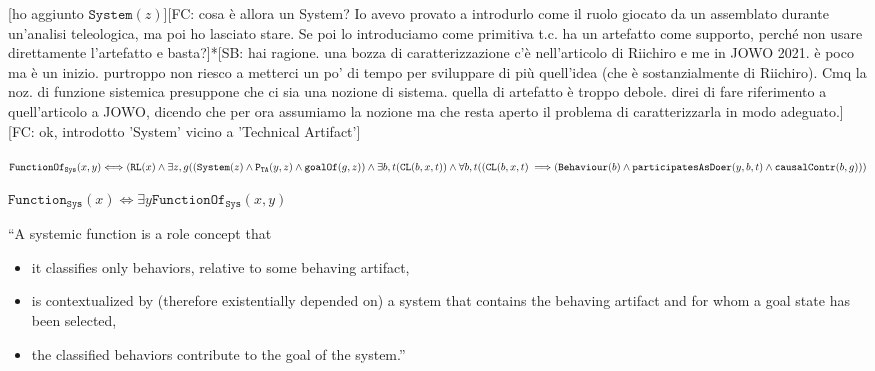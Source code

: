 \documentclass[sw]{iosart2x}
\newcommand{\bflist}{\begin{list}{}{\setlength{\topsep}{2mm}\setlength{\partopsep}{0mm}\setlength{\parsep}{0mm}\setlength{\leftmargin}{9mm}\setlength{\labelwidth}{8mm}}}
\newcommand{\eflist}{\end{list}}
\newcommand{\DefLabel}{\textrm{d}}
\newcounter{cntdef}
\newcommand{\mydf}[1]{\refstepcounter{cntdef}\begin{small}{\bf \DefLabel\thecntdef\label{def:#1}}\end{small}}
\newcommand{\generalStyle}[1]{\texttt{#1}}
\newcommand{\biRel}[3]{\generalStyle{#1}(#2,#3)}
\newcommand{\uniRel}[2]{\generalStyle{#1}(#2)}
\newcommand{\uniRelPar}[3]{\generalStyle{#1}_{\generalStyle{#3}}(#2)}
\newcommand{\biRelPar}[4]{\generalStyle{#1}_{\generalStyle{#4}}(#2,#3)}
\newcommand{\triRelPar}[5]{\generalStyle{#1}_{\generalStyle{#5}}(#2,#3,#4)}
\newcommand{\triRel}[4]{\generalStyle{#1}(#2,#3,#4)}
\newcommand{\myiff}{\Longleftrightarrow}
\newcommand{\myfi}{\hspace{0.9mm} \Longrightarrow}
\newcommand{\DOLCERole}[1]{\uniRel{{RL}}{#1}}
\newcommand{\DOLCEPart}[3]{\triRel{{P}}{#1}{#2}{#3}}
\newcommand{\DOLCECLby}[3]{\triRel{CL}{#1}{#2}{#3}}
\newcommand{\BehaviourConcrete}[1]{\uniRel{Behaviour}{#1}}
\newcommand{\System}[1]{\uniRel{System}{#1}}
\newcommand{\FunctionSys}[1]{\uniRelPar{Function}{#1}{Sys}}
\newcommand{\FunctionSysOf}[2]{\biRelPar{FunctionOf}{#1}{#2}{Sys}}
\newcommand{\contextOf}[2]{\biRel{contextOf}{#1}{#2}}
\newcommand{\causallyContr}[2]{\biRel{causalContr}{#1}{#2}}
\newcommand{\participateAsDoer}[3]{\triRel{participatesAsDoer}{#1}{#2}{#3}}
\newcommand{\goalOf}[2]{\biRel{goalOf}{#1}{#2}}
\newcommand{\partTABin}[2]{\biRelPar{P}{#1}{#2}{TA}}
\newcommand{\partTA}[3]{\triRelPar{P}{#1}{#2}{#3}{TA}}
\newcommand{\TODO}[1]{{\color{red} #1}}
\begin{document}
\TODO{[ho aggiunto $\System{z}$][FC: cosa è allora un System? Io avevo provato a introdurlo come il ruolo giocato da un assemblato durante un'analisi teleologica, ma poi ho lasciato stare. Se poi lo introduciamo come primitiva t.c. ha un artefatto come supporto, perché non usare direttamente l'artefatto e basta?]*[SB: hai ragione. una bozza di caratterizzazione c'è nell'articolo di Riichiro e me in JOWO 2021. è poco ma è un inizio. purtroppo non riesco a metterci un po' di tempo per sviluppare di più quell'idea (che è sostanzialmente di Riichiro). Cmq la noz. di funzione sistemica presuppone che ci sia una nozione di sistema. quella di artefatto è troppo debole. direi di fare riferimento a quell'articolo a JOWO, dicendo che per ora assumiamo la nozione ma che resta aperto il problema di caratterizzarla in modo adeguato.][FC: ok, introdotto 'System' vicino a 'Technical Artifact']}
\bflist
  


  \item[\mydf{functionOf}] $ \FunctionSysOf{x}{y} \myiff (\DOLCERole{x} \land 
  \exists z,g ((\System{z} \land \partTABin{y}{z} \land \goalOf{g}{z}) \land \exists b,t  (\DOLCECLby{b}{x}{t}) \land\\
    \forall b,t ((\DOLCECLby{b}{x}{t} \myfi (\BehaviourConcrete{b} \land 
      \participateAsDoer{y}{b}{t} \land \causallyContr{b}{g}))  $
  \item[\mydf{function}] $ \FunctionSys{x} \myiff \exists y \FunctionSysOf{x}{y}$
  \item [] {``A systemic function is a role concept that 
  \begin{itemize}[topsep=0pt]
    \item it classifies only behaviors, relative to some behaving artifact, 
    \item is contextualized by (therefore existentially depended on) a system that contains the behaving artifact and for whom a goal state has been selected, 
    \item the classified behaviors contribute to the goal of the system.'' %
  \end{itemize}}
\eflist
\end{document}
